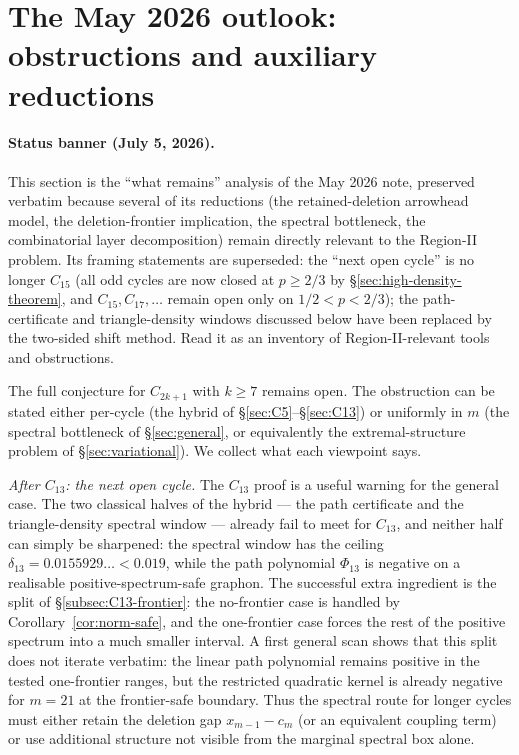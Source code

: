 \documentclass[11pt]{article}
\begin{document}
\section{The May 2026 outlook: obstructions and auxiliary reductions}\label{sec:remains}\label{sec:remains-old}

\paragraph{Status banner (July 5, 2026).}  This section is the ``what
remains'' analysis of the May 2026 note, preserved verbatim because several
of its reductions (the retained-deletion arrowhead model, the deletion-frontier
implication, the spectral bottleneck, the combinatorial layer decomposition)
remain directly relevant to the Region-II problem.  Its framing statements
are superseded: the ``next open cycle'' is no longer $C_{15}$ (all odd cycles
are now closed at $p\ge2/3$ by \S\ref{sec:high-density-theorem}, and
$C_{15},C_{17},\ldots$ remain open only on $1/2<p<2/3$); the path-certificate
and triangle-density windows discussed below have been replaced by the
two-sided shift method.  Read it as an inventory of Region-II-relevant tools
and obstructions.


The full conjecture for $C_{2k+1}$ with $k\ge7$ remains open.  The obstruction can be stated either per-cycle (the hybrid of \S\ref{sec:C5}--\S\ref{sec:C13}) or uniformly in $m$ (the spectral bottleneck of \S\ref{sec:general}, or equivalently the extremal-structure problem of \S\ref{sec:variational}).  We collect what each viewpoint says.

\medskip\noindent\emph{After $C_{13}$: the next open cycle.}
The $C_{13}$ proof is a useful warning for the general case.  The two classical halves of the hybrid --- the path certificate and the triangle-density spectral window --- already fail to meet for $C_{13}$, and neither half can simply be sharpened: the spectral window has the ceiling $\delta_{13}=0.0155929\ldots<0.019$, while the path polynomial $\Phi_{13}$ is negative on a realisable positive-spectrum-safe graphon.  The successful extra ingredient is the split of \S\ref{subsec:C13-frontier}: the no-frontier case is handled by Corollary~\ref{cor:norm-safe}, and the one-frontier case forces the rest of the positive spectrum into a much smaller interval.  A first general scan shows that this split does not iterate verbatim: the linear path polynomial remains positive in the tested one-frontier ranges, but the restricted quadratic kernel is already negative for $m=21$ at the frontier-safe boundary.  Thus the spectral route for longer cycles must either retain the deletion gap $x_{m-1}-c_m$ (or an equivalent coupling term) or use additional structure not visible from the marginal spectral box alone.
\end{document}
